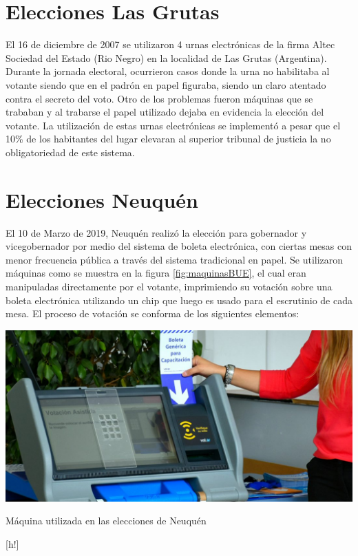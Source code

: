 \section{Elecciones Las Grutas}
El 16 de diciembre de 2007 se utilizaron 4 urnas electrónicas de la firma Altec Sociedad del Estado (Rio Negro) en la localidad de Las Grutas (Argentina). Durante la jornada electoral, ocurrieron casos donde la urna no habilitaba al votante siendo que en el padrón en papel figuraba, siendo un claro atentado contra el secreto del voto. Otro de los problemas fueron máquinas que se trababan y al trabarse el papel utilizado dejaba en evidencia la elección del votante. La utilización de estas urnas electrónicas se implementó a pesar que el 10\% de los habitantes del lugar elevaran al superior tribunal de justicia la no obligatoriedad de este sistema. \cite{eleccionesLasGrutas}

\section{Elecciones Neuquén}
El 10 de Marzo de 2019, Neuquén realizó la elección para gobernador y vicegobernador por medio del sistema de boleta electrónica, con ciertas mesas con menor frecuencia pública a través del sistema tradicional en papel. Se utilizaron máquinas como se muestra en la figura \ref{fig:maquinasBUE}, el cual eran manipuladas directamente por el votante, imprimiendo su votación sobre una boleta electrónica utilizando un chip que luego es usado para el escrutinio de cada mesa. El proceso de votación se conforma de los siguientes elementos:

\begin{center}
  \includegraphics[scale=0.4]{Maquina_BUE.jpg}
  \caption{Máquina utilizada en las elecciones de Neuquén}
  \label{fig:maquinasBUE}
\end{center}[h!]

